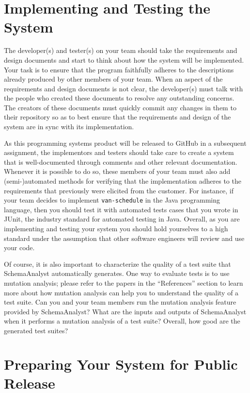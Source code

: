 \section*{Implementing and Testing the System}

The developer(s) and tester(s) on your team should take the requirements and design documents and start to think about
how the system will be implemented. Your task is to ensure that the program faithfully adheres to the descriptions
already produced by other members of your team. When an aspect of the requirements and design documents is not clear,
the developer(s) must talk with the people who created these documents to resolve any outstanding concerns. The creators
of these documents must quickly commit any changes in them to their repository so as to best ensure that the
requirements and design of the system are in sync with its implementation.

As this programming systems product will be released to GitHub in a subsequent assignment, the implementors and testers
should take care to create a system that is well-documented through comments and other relevant documentation. Whenever
it is possible to do so, these members of your team must also add (semi-)automated methods for verifying that the
implementation adheres to the requirements that previously were elicited from the customer. For instance, if your team
decides to implement {\tt van-schedule} in the Java programming language, then you should test it with automated tests
cases that you wrote in JUnit, the industry standard for automated testing in Java. Overall, as you are implementing and
testing your system you should hold yourselves to a high standard under the assumption that other software engineers
will review and use your code.

Of course, it is also important to characterize the quality of a test suite that SchemaAnalyst automatically generates.
One way to evaluate tests is to use mutation analysis; please refer to the papers in the ``References'' section to learn
more about how mutation analysis can help you to understand the quality of a test suite. Can you and your team members
run the mutation analysis feature provided by SchemaAnalyst? What are the inputs and outputs of SchemaAnalyst when it
performs a mutation analysis of a test suite? Overall, how good are the generated test suites?

\vspace*{-.05in}
\section*{Preparing Your System for Public Release}

